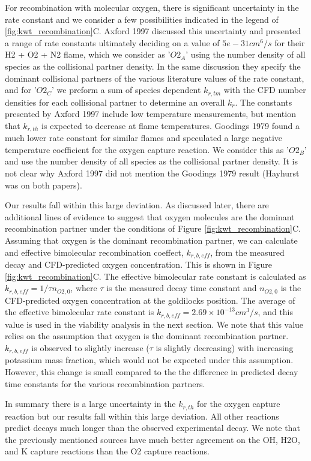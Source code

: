 For recombination with molecular oxygen, there is significant uncertainty in the rate constant and we consider a few possibilities indicated in the legend of \ref{fig:kwt_recombination}C. Axford 1997 discussed this uncertainty and presented a range of rate constants ultimately deciding on a value of $5e-31 cm^6/s$ for their H2 + O2 + N2 flame, which we consider as '$O2_A$' using the number density of all species as the collisional partner density. In the same discussion they specify the dominant collisional partners of the various literature values of the rate constant, and for '$O2_C$' we preform a sum of species dependent $k_{r,tm}$ with the CFD number densities for each collisional partner to determine an overall $k_r$. The constants presented by Axford 1997 include low temperature measurements, but mention that $k_{r,th}$ is expected to decrease at flame temperatures. Goodings 1979 found a much lower rate constant for similar flames and speculated a large negative temperature coefficient for the oxygen capture reaction. We consider this as '$O2_B$' and use the number density of all species as the collisional partner density. It is not clear why Axford 1997 did not mention the Goodings 1979 result (Hayhurst was on both papers).   

Our results fall within this large deviation. As discussed later, there are additional lines of evidence to suggest that oxygen molecules are the dominant recombination partner under the conditions of Figure \ref{fig:kwt_recombination}C. Assuming that oxygen is the dominant recombination partner, we can calculate and effective bimolecular recombination coeffect, $k_{r,b,eff}$, from the measured decay and CFD-predicted oxygen concentration. This is shown in Figure \ref{fig:kwt_recombination}C. The effective bimolecular rate constant is calculated as $k_{r,b,eff} = 1/\tau n_{O2,0}$, where $\tau$ is the measured decay time constant and $n_{O2,0}$ is the CFD-predicted oxygen concentration at the goldilocks position. The average of the effective bimolecular rate constant is $k_{r,b,eff} =  2.69 \times 10^{-13} cm^3/s$, and this value is used in the viability analysis in the next section. We note that this value relies on the assumption that oxygen is the dominant recombination partner. $k_{r,b,eff}$ is observed to slightly increase ($\tau$ is slightly decreasing) with increasing potassium mass fraction, which would not be expected under this assumption. However, this change is small compared to the the difference in predicted decay time constants for the various recombination partners.

In summary there is a large uncertainty in the $k_{r,th}$ for the oxygen capture reaction but our results fall within this large deviation. All other reactions predict decays much longer than the observed experimental decay. We note that the previously mentioned sources have much better agreement on the OH, H2O, and K capture reactions than the O2 capture reactions. 





